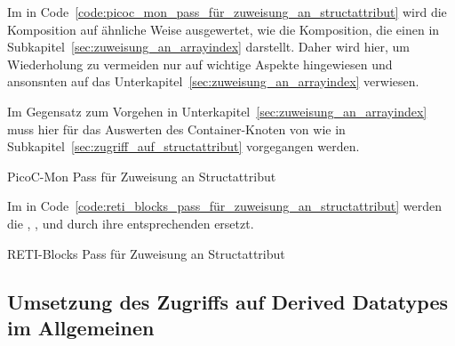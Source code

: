 Im  in Code~\ref{code:picoc_mon_pass_für_zuweisung_an_structattribut} wird die Komposition  auf ähnliche Weise ausgewertet, wie die Komposition, die einen   in Subkapitel~\ref{sec:zuweisung_an_arrayindex} darstellt. Daher wird hier, um Wiederholung zu vermeiden nur auf wichtige Aspekte hingewiesen und ansonsnten auf das Unterkapitel~\ref{sec:zuweisung_an_arrayindex} verwiesen.

Im Gegensatz zum Vorgehen in Unterkapitel~\ref{sec:zuweisung_an_arrayindex} muss hier für das Auswerten des  Container-Knoten  von  wie in Subkapitel~\ref{sec:zugriff_auf_structattribut} vorgegangen werden.

\begin{code}
  \centering
  \caption{PicoC-Mon Pass für Zuweisung an Structattribut}
  \label{code:picoc_mon_pass_für_zuweisung_an_structattribut}
\end{code}

Im  in Code~\ref{code:reti_blocks_pass_für_zuweisung_an_structattribut} werden die  , ,  und  durch ihre entsprechenden  ersetzt.

\begin{code}
  \centering
  \caption{RETI-Blocks Pass für Zuweisung an Structattribut}
  \label{code:reti_blocks_pass_für_zuweisung_an_structattribut}
\end{code}

\subsection{Umsetzung des Zugriffs auf Derived Datatypes im Allgemeinen}


